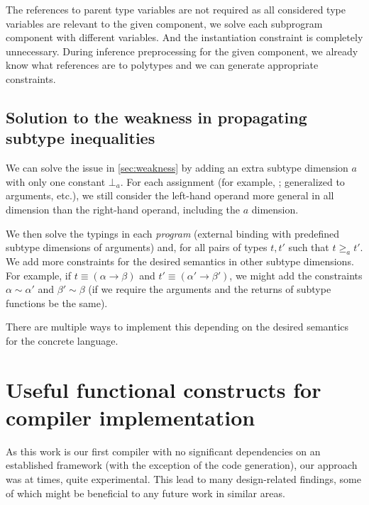The references to parent type variables are not required as all considered type variables are relevant to the given component, we solve each subprogram component with different variables. And the instantiation constraint is completely unnecessary. During inference preprocessing for the given component, we already know what references are to polytypes and we can generate appropriate constraints.

\subsection{Solution to the weakness in propagating subtype inequalities}

We can solve the issue in \cref{sec:weakness} by adding an extra subtype dimension $a$ with only one constant $\bot_a$. For each assignment (for example, ; generalized to arguments, etc.), we still consider the left-hand operand more general in all dimension than the right-hand operand, including the $a$ dimension.

We then solve the typings in each \emph{program} (external binding with predefined subtype dimensions of arguments) and, for all pairs of types $t, t'$ such that $t \geq_a t'$. We add more constraints for the desired semantics in other subtype dimensions. For example, if $t \equiv (\alpha \to \beta)$ and $t' \equiv (\alpha' \to \beta')$, we might add the constraints $\alpha \sim \alpha'$ and $\beta' \sim \beta$ (if we require the arguments and the returns of subtype functions be the same).

There are multiple ways to implement this depending on the desired semantics for the concrete language.

\section{Useful functional constructs for compiler implementation}

As this work is our first compiler with no significant dependencies on an established framework (with the exception of the code generation), our approach was at times, quite experimental. This lead to many design-related findings, some of which might be beneficial to any future work in similar areas.


